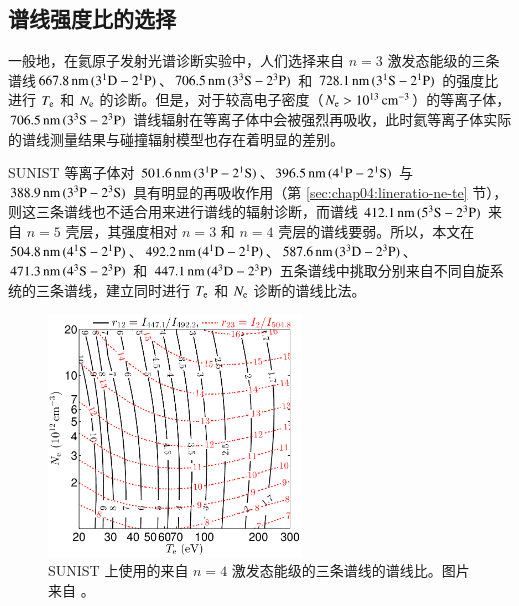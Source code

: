 \subsection{谱线强度比的选择}
\label{sec:chap03:lineratio-selection}

一般地，在氦原子发射光谱诊断实验中，人们选择来自 $n=3$ 激发态能级的三条谱线\pozhehao $667.8\,{\rm nm}\,(3^1{\rm D}-2^1{\rm P})$、$706.5\,{\rm nm}\,(3^3{\rm S}-2^3{\rm P})$ 和 $728.1\,{\rm nm}\,(3^1{\rm S}-2^1{\rm P})$ \pozhehao 的强度比进行 $T_{\rm e}$ 和 $N_{\rm e}$ 的诊断。但是，对于较高电子密度（$N_{\rm e}>10^{13}\,{\rm cm}^{-3}$）的等离子体，$706.5\,{\rm nm}\,(3^3{\rm S}-2^3{\rm P})$ 谱线辐射在等离子体中会被强烈再吸收\cite{boivin2001,Boivin2007}，此时氦等离子体实际的谱线测量结果与碰撞辐射模型也存在着明显的差别\cite{Schweer1992174,Brosda1993:Thesis,Sasaki:NIFS:DATA:346}。

SUNIST 等离子体对 $501.6\,{\rm nm}\,(3^1{\rm P}-2^1{\rm S})$、$396.5\,{\rm nm}\,(4^1{\rm P}-2^1{\rm S})$ 与 $388.9\,{\rm nm}\,(3^3{\rm P}-2^3{\rm S})$ 具有明显的再吸收作用（第 \ref{sec:chap04:lineratio-ne-te} 节），则这三条谱线也不适合用来进行谱线的辐射诊断，而谱线 $412.1\,{\rm nm}\,(5^3{\rm S}-2^3{\rm P})$ 来自 $n=5$ 壳层，其强度相对 $n=3$ 和 $n=4$ 壳层的谱线要弱。所以，本文在 $504.8\,{\rm nm}\,(4^1{\rm S}-2^1{\rm P})$、$492.2\,{\rm nm}\,(4^1{\rm D}-2^1{\rm P})$、$587.6\,{\rm nm}\,(3^3{\rm D}-2^3{\rm P})$、$471.3\,{\rm nm}\,(4^3{\rm S}-2^3{\rm P})$ 和 $447.1\,{\rm nm}\,(4^3{\rm D}-2^3{\rm P})$ 五条谱线中挑取分别来自不同自旋系统的三条谱线，建立同时进行 $T_{\rm e}$ 和 $N_{\rm e}$ 诊断的谱线比法。

\begin{figure}
  \centering
  \includegraphics[width=0.6\textwidth]{1-9to7-7to5-getTeNe-lineratio.pdf}
  \caption{SUNIST 上使用的来自 $n=4$ 激发态能级的三条谱线的谱线比。图片来自 。}
  \label{fig:chap03:getTeNe-lineratio}
\end{figure}

